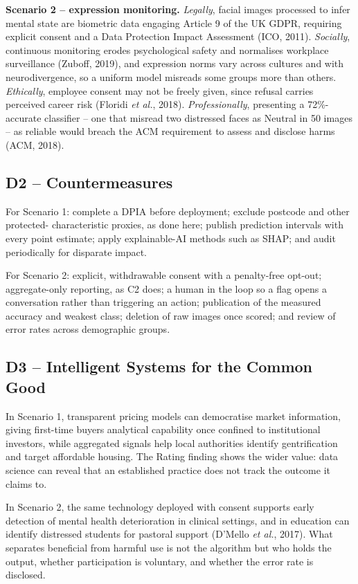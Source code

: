 \documentclass[11pt,a4paper]{article}
\begin{document}
\textbf{Scenario 2 -- expression monitoring.} \emph{Legally}, facial images processed to infer
mental state are biometric data engaging Article 9 of the UK GDPR, requiring explicit consent
and a Data Protection Impact Assessment (ICO, 2011). \emph{Socially}, continuous monitoring
erodes psychological safety and normalises workplace surveillance (Zuboff, 2019), and
expression norms vary across cultures and with neurodivergence, so a uniform model misreads
some groups more than others. \emph{Ethically},
employee consent may not be freely given, since refusal carries perceived career risk (Floridi
\emph{et al.}, 2018). \emph{Professionally}, presenting a 72\%-accurate classifier -- one that
misread two distressed faces as Neutral in 50 images -- as reliable would breach the ACM
requirement to assess and disclose harms (ACM, 2018).

\subsection{D2 -- Countermeasures}

For Scenario 1: complete a DPIA before deployment; exclude postcode and other protected-
characteristic proxies, as done here; publish prediction intervals with every point estimate;
apply explainable-AI methods such as SHAP; and audit periodically for disparate impact.

For Scenario 2: explicit, withdrawable consent with a penalty-free opt-out; aggregate-only
reporting, as C2 does; a human in the loop so a flag opens a conversation rather than triggering
an action; publication of the measured accuracy and weakest class; deletion of raw images once
scored; and review of error rates across demographic groups.

\subsection{D3 -- Intelligent Systems for the Common Good}

In Scenario 1, transparent pricing models can democratise market information, giving first-time
buyers analytical capability once confined to institutional investors, while aggregated signals
help local authorities identify gentrification and target affordable housing. The Rating finding
shows the wider value: data science can reveal that an established practice does not track the
outcome it claims to.

In Scenario 2, the same technology deployed with consent supports early detection of mental
health deterioration in clinical settings, and in education can identify distressed students for
pastoral support (D'Mello \emph{et al.}, 2017). What separates beneficial from harmful use is
not the algorithm but who holds the output, whether participation is voluntary, and whether the
error rate is disclosed.
\end{document}

